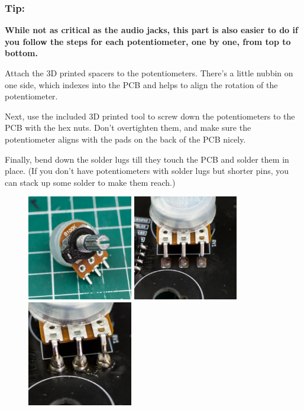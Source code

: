\documentclass[12pt, a4paper]{article}
\begin{document}
\subsubsection*{Tip:}
\vspace{-3mm}
\textbf{While not as critical as the audio jacks, this part is also easier to do if you follow the
steps for each potentiometer, one by one, from top to bottom.}
\vspace{5mm}

Attach the 3D printed spacers to the potentiometers. There's a little nubbin on one side, which
indexes into the PCB and helps to align the rotation of the potentiometer.

Next, use the included 3D printed tool to screw down the potentiometers to the PCB with the
hex nuts. Don't overtighten them, and make sure the potentiometer aligns with the pads on the
back of the PCB nicely.

Finally, bend down the solder lugs till they touch the PCB and solder them in place.
(If you don't have potentiometers with solder lugs but shorter pins, you can stack up some
solder to make them reach.)

\begin{figure}[H]
    \centering
    \includegraphics[width=46mm]{images/section_3-4_washer.jpg}
    \hspace{2mm}
    \includegraphics[width=46mm]{images/section_3-4_screwed.jpg}
    \hspace{2mm}
    \includegraphics[width=46mm]{images/section_3-4_solder_stack.jpg}
\end{figure}
\end{document}
